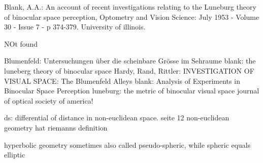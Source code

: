 


Blank, A.A.: An account of recent investigations relating to the Luneburg theory of binocular space perception, Optometry and Vision Science: July 1953 - Volume 30 - Issue 7 - p 374-379. University of illinois. 



NOt found

Blumenfeld: Untersuchungen über die scheinbare Grösse im Sehraume
blank: the luneberg theory of binocular space
Hardy, Rand, Rittler: INVESTIGATION OF VISUAL SPACE: The Blumenfeld Alleys
blank: Analysis of Experiments in Binocular Space Perception
luneburg: the metric of binocular visual space
journal of optical society of america!




ds: differential of distance in non-euclidean space.
seite 12 non-euclidean geometry hat riemanns definition

hyperbolic geometry sometimes also called pseudo-spheric, while spheric equals elliptic





